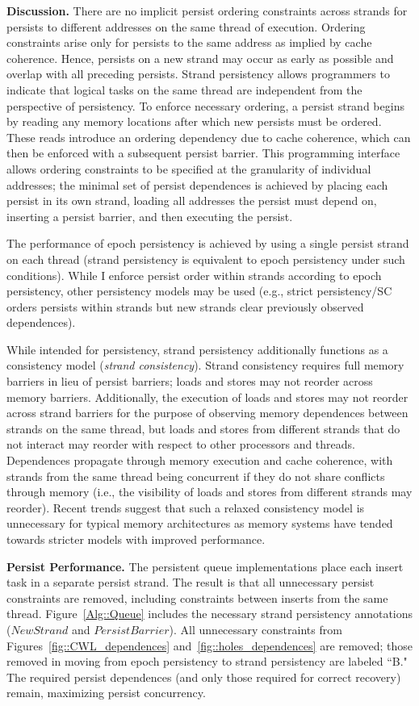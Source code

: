 \textbf{Discussion.}
There are no implicit persist ordering constraints across strands for persists to different addresses on the same thread of execution.
Ordering constraints arise only for persists to the same address as implied by cache coherence.
Hence, persists on a new strand may occur as early as possible and overlap with all preceding persists.
Strand persistency allows programmers to indicate that logical tasks on the same thread are independent from the perspective of persistency.
To enforce necessary ordering, a persist strand begins by reading any memory locations after which new persists must be ordered.
These reads introduce an ordering dependency due to cache coherence, which can then be enforced with a subsequent persist barrier.
This programming interface allows ordering constraints to be specified at the granularity of individual addresses; the minimal set of persist dependences is achieved by placing each persist in its own strand, loading all addresses the persist must depend on, inserting a persist barrier, and then executing the persist.

The performance of epoch persistency is achieved by using a single persist strand on each thread (strand persistency is equivalent to epoch persistency under such conditions).
While I enforce persist order within strands according to epoch persistency, other persistency models may be used (e.g., strict persistency/SC orders persists within strands but new strands clear previously observed dependences).

While intended for persistency, strand persistency additionally functions as a consistency model (\emph{strand consistency}).
Strand consistency requires full memory barriers in lieu of persist barriers; loads and stores may not reorder across memory barriers.
Additionally, the execution of loads and stores may not reorder across strand barriers for the purpose of observing memory dependences between strands on the same thread, but loads and stores from different strands that do not interact may reorder with respect to other processors and threads.
Dependences propagate through memory execution and cache coherence, with strands from the same thread being concurrent if they do not share conflicts through memory (i.e., the visibility of loads and stores from different strands may reorder).
Recent trends suggest that such a relaxed consistency model is unnecessary for typical memory architectures as memory systems have tended towards stricter models with improved performance.

\textbf{Persist Performance.}
The persistent queue implementations place each insert task in a separate persist strand.
The result is that all unnecessary persist constraints are removed, including constraints between inserts from the same thread.
Figure~\ref{Alg::Queue} includes the necessary strand persistency annotations ($NewStrand$ and $PersistBarrier$).
All unnecessary constraints from Figures~\ref{fig::CWL_dependences} and~\ref{fig::holes_dependences} are removed; those removed in moving from epoch persistency to strand persistency are labeled ``B."
The required persist dependences (and only those required for correct recovery) remain, maximizing persist concurrency.

